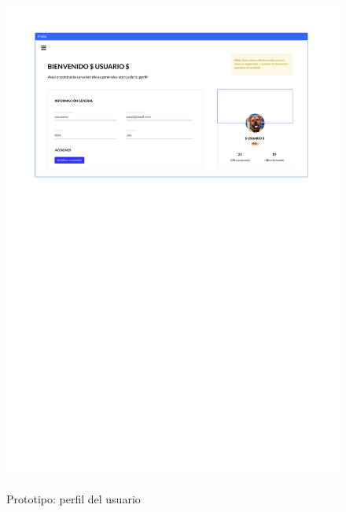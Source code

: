 \begin{figure}[h]
	\caption{Prototipo: perfil del usuario}
	\centering
	\includegraphics[width=\textwidth]{../img/anexos/mockups/4-mockups-profile}
	\label{mock:profile}
\end{figure}

